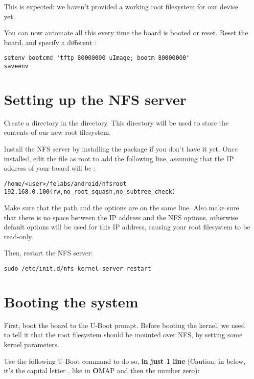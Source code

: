 This is expected: we haven't provided a working root filesystem for
our device yet.

You can now automate all this every time the board is booted or
reset. Reset the board, and specify a different :

\begin{verbatim}
setenv bootcmd 'tftp 80000000 uImage; bootm 80000000'
saveenv
\end{verbatim}

\section{Setting up the NFS server}

Create a  directory in the 
directory. This  directory will be used to store the
contents of our new root filesystem.

Install the NFS server by installing the 
package if you don't have it yet. Once installed, edit the
 file as root to add the following line, assuming that the
IP address of your board will be :

\footnotesize
\begin{verbatim}
/home/<user>/felabs/android/nfsroot 192.168.0.100(rw,no_root_squash,no_subtree_check)
\end{verbatim}
\normalsize

Make sure that the path and the options are on the same line.
Also make sure that there is no space between the IP address and the NFS
options, otherwise default options will be used for this IP address,
causing your root filesystem to be read-only.

Then, restart the NFS server:

\begin{verbatim}
sudo /etc/init.d/nfs-kernel-server restart
\end{verbatim}

\section{Booting the system}

First, boot the board to the U-Boot prompt. Before booting the kernel,
we need to tell it that the root filesystem should be mounted over
NFS, by setting some kernel parameters.

Use the following U-Boot command to do so, {\bf in just 1 line}
(Caution: in  below, it's the capital letter , like in
{\bf O}MAP and then the number zero):

